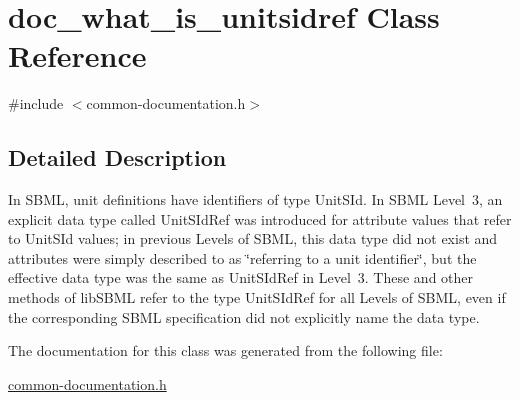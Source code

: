 \hypertarget{classdoc__what__is__unitsidref}{}\section{doc\+\_\+what\+\_\+is\+\_\+unitsidref Class Reference}
\label{classdoc__what__is__unitsidref}


{\ttfamily \#include $<$common-\/documentation.\+h$>$}



\subsection{Detailed Description}
\begin{DoxyParagraph}{}
In S\+B\+ML, unit definitions have identifiers of type {\ttfamily Unit\+S\+Id}. In S\+B\+ML Level~3, an explicit data type called {\ttfamily Unit\+S\+Id\+Ref} was introduced for attribute values that refer to {\ttfamily Unit\+S\+Id} values; in previous Levels of S\+B\+ML, this data type did not exist and attributes were simply described to as \char`\"{}referring to a unit identifier\char`\"{}, but the effective data type was the same as {\ttfamily Unit\+S\+Id\+Ref} in Level~3. These and other methods of lib\+S\+B\+ML refer to the type {\ttfamily Unit\+S\+Id\+Ref} for all Levels of S\+B\+ML, even if the corresponding S\+B\+ML specification did not explicitly name the data type. 
\end{DoxyParagraph}


The documentation for this class was generated from the following file\+:\begin{DoxyCompactItemize}
\item 
\hyperlink{common-documentation_8h}{common-\/documentation.\+h}\end{DoxyCompactItemize}
